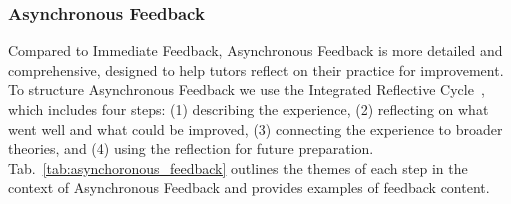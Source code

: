 \subsubsection{Asynchronous Feedback}
\label{subsec:Asynchronous Feedback }
Compared to Immediate Feedback, Asynchronous Feedback is more detailed and comprehensive, designed to help tutors reflect on their practice for improvement. To structure Asynchronous Feedback we use the Integrated Reflective Cycle~\cite{bassot2015reflective}, which includes four steps: (1) describing the experience, (2) reflecting on what went well and what could be improved, (3) connecting the experience to broader theories, and (4) using the reflection for future preparation. %
Tab.~\ref{tab:asynchoronous_feedback} outlines the themes of each step in the context of Asynchronous Feedback and provides examples of feedback content.



